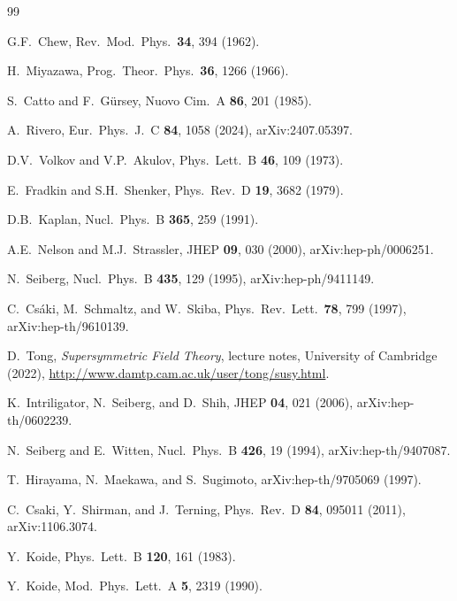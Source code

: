 \documentclass[aps,prd,twocolumn,showpacs,preprintnumbers,superscriptaddress,floatfix]{revtex4-2}
\begin{document}
\begin{thebibliography}{99}

  G.F.~Chew,
  Rev.\ Mod.\ Phys.\ \textbf{34}, 394 (1962).

  H.~Miyazawa,
  Prog.\ Theor.\ Phys.\ \textbf{36}, 1266 (1966).

  S.~Catto and F.~G\"ursey,
  Nuovo Cim.\ A \textbf{86}, 201 (1985).

  A.~Rivero,
  Eur.\ Phys.\ J.\ C \textbf{84}, 1058 (2024),
  arXiv:2407.05397.

  D.V.~Volkov and V.P.~Akulov,
  Phys.\ Lett.\ B \textbf{46}, 109 (1973).

  E.~Fradkin and S.H.~Shenker,
  Phys.\ Rev.\ D \textbf{19}, 3682 (1979).

  D.B.~Kaplan,
  Nucl.\ Phys.\ B \textbf{365}, 259 (1991).

  A.E.~Nelson and M.J.~Strassler,
  JHEP \textbf{09}, 030 (2000),
  arXiv:hep-ph/0006251.

  N.~Seiberg,
  Nucl.\ Phys.\ B \textbf{435}, 129 (1995),
  arXiv:hep-ph/9411149.

  C.~Cs\'aki, M.~Schmaltz, and W.~Skiba,
  Phys.\ Rev.\ Lett.\ \textbf{78}, 799 (1997),
  arXiv:hep-th/9610139.

  D.~Tong,
  \textit{Supersymmetric Field Theory},
  lecture notes, University of Cambridge (2022),
  \url{http://www.damtp.cam.ac.uk/user/tong/susy.html}.

  K.~Intriligator, N.~Seiberg, and D.~Shih,
  JHEP \textbf{04}, 021 (2006),
  arXiv:hep-th/0602239.

  N.~Seiberg and E.~Witten,
  Nucl.\ Phys.\ B \textbf{426}, 19 (1994),
  arXiv:hep-th/9407087.

  T.~Hirayama, N.~Maekawa, and S.~Sugimoto,
  arXiv:hep-th/9705069 (1997).

  C.~Csaki, Y.~Shirman, and J.~Terning,
  Phys.\ Rev.\ D \textbf{84}, 095011 (2011),
  arXiv:1106.3074.

  Y.~Koide,
  Phys.\ Lett.\ B \textbf{120}, 161 (1983).

  Y.~Koide,
  Mod.\ Phys.\ Lett.\ A \textbf{5}, 2319 (1990).


\end{thebibliography}
\end{document}
